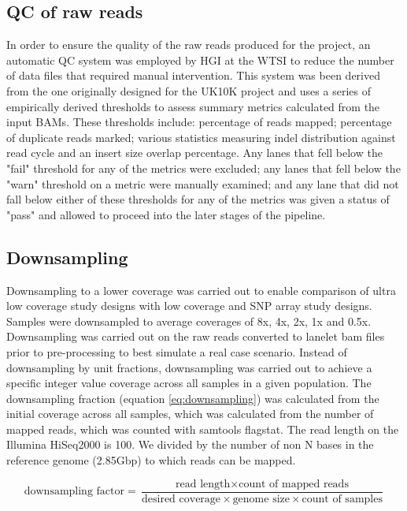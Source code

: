 \subsection{QC of raw reads}
In order to ensure the quality of the raw reads produced for the project, an automatic \gls{QC} system was employed by \gls{HGI} at the \gls{WTSI} to reduce the number of data files that required manual intervention. This system was been derived from the one originally designed for the UK10K project and uses a series of empirically derived thresholds to assess summary metrics calculated from the input \glspl{BAM}. These thresholds include: percentage of reads mapped; percentage of duplicate reads marked; various statistics measuring indel distribution against read cycle and an insert size overlap percentage. Any lanes that fell below the "fail" threshold for any of the metrics were excluded; any lanes that fell below the "warn" threshold on a metric were manually examined; and any lane that did not fall below either of these thresholds for any of the metrics was given a status of "pass" and allowed to proceed into the later stages of the pipeline.

\subsection{Downsampling}
Downsampling to a lower coverage was carried out to enable comparison of ultra low coverage study designs with low coverage and SNP array study designs. Samples were downsampled to average coverages of 8x, 4x, 2x, 1x and 0.5x. Downsampling was carried out on the raw reads converted to lanelet bam files prior to pre-processing to best simulate a real case scenario. Instead of downsampling by unit fractions\cite{10.1371/journal.pcbi.1002604}, downsampling was carried out to achieve a specific integer value coverage across all samples in a given population. The downsampling fraction (equation \ref{eq:downsampling}) was calculated from the initial coverage across all samples, which was calculated from the number of mapped reads, which was counted with samtools\cite{Li15082009} flagstat. The read length on the Illumina HiSeq2000 is 100. We divided by the number of non N bases in the reference genome (2.85\gls{Gbp}) to which reads can be mapped.

\begin{equation}
\text{downsampling factor} =  \frac
{\text{read length} \times \text{count of mapped reads}}
{\text{desired coverage} \times \text{genome size} \times \text{count of samples}}
\label{eq:downsampling}
\end{equation}


